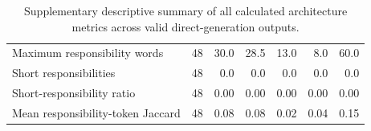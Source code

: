\begin{table}[t]
\begin{tabular}{lrrrrrr}
Maximum responsibility words & 48 & 30.0 & 28.5 & 13.0 & 8.0 & 60.0 \\
Short responsibilities & 48 & 0.0 & 0.0 & 0.0 & 0.0 & 0.0 \\
Short-responsibility ratio & 48 & 0.00 & 0.00 & 0.00 & 0.00 & 0.00 \\
Mean responsibility-token Jaccard & 48 & 0.08 & 0.08 & 0.02 & 0.04 & 0.15 \\
\bottomrule
\end{tabular}
\caption{Supplementary descriptive summary of all calculated architecture metrics across valid direct-generation outputs.}
\label{tab:s1-direct-architecture-metrics}
\end{table}
